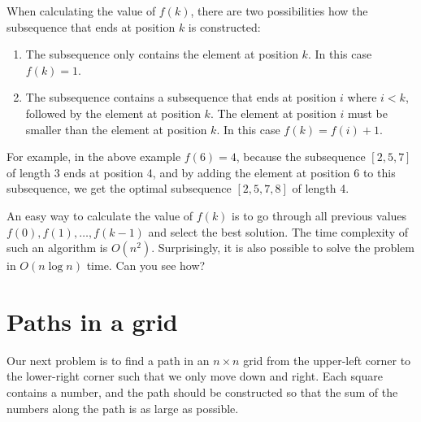 When calculating the value of $f(k)$,
there are two possibilities how the subsequence
that ends at position $k$ is constructed:
\begin{enumerate}
\item The subsequence
only contains the element at position $k$. In this case $f(k)=1$.
\item The subsequence contains a subsequence
that ends at position $i$ where $i<k$,
followed by the element at position $k$.
The element at position $i$ must be smaller
than the element at position $k$.
In this case $f(k)=f(i)+1$.
\end{enumerate}

For example, in the above example $f(6)=4$,
because the subsequence $[2,5,7]$ of length 3
ends at position 4, and by adding the element
at position 6 to this subsequence,
we get the optimal subsequence $[2,5,7,8]$ of length 4.

An easy way to calculate the
value of $f(k)$ is to
go through all previous values
$f(0),f(1),\ldots,f(k-1)$ and select the best solution.
The time complexity of such an algorithm is $O(n^2)$.
Surprisingly, it is also possible to solve the
problem in $O(n \log n)$ time. Can you see how?

\section{Paths in a grid}

Our next problem is to find a path
in an $n \times n$ grid
from the upper-left corner to
the lower-right corner such that
we only move down and right.
Each square contains a number,
and the path should be constructed so
that the sum of the numbers along
the path is as large as possible.

